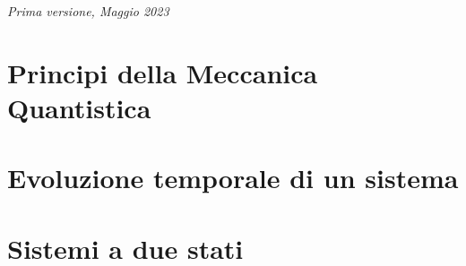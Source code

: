 \documentclass[11pt,fleqn]{book} %
\begin{document}
\noindent \textit{Prima versione, Maggio 2023} %




\pagestyle{empty} %

\tableofcontents %

\cleardoublepage %

\pagestyle{fancy} %



\chapter{Principi della Meccanica Quantistica}




\chapter{Evoluzione temporale di un sistema}




\chapter{Sistemi a due stati}



\end{document}
